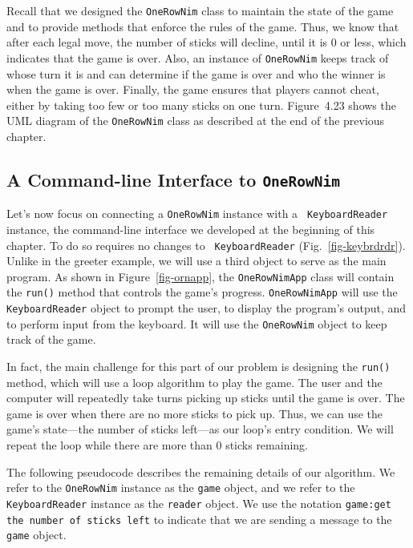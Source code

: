 Recall that we designed the {\tt OneRowNim} class to maintain the state of
the game and to provide methods that enforce the rules of the
game. Thus, we know that after each legal move, the number of sticks will
decline, until it is 0 or less, which indicates that the game is over. 
Also, an instance of {\tt OneRowNim} keeps track of whose turn it is and 
can determine if the game is over and who the winner is when the
game is over.  Finally, the game ensures that players cannot cheat, either 
by taking too few or too many sticks on one turn. 
Figure~4.23 shows the UML diagram of the {\tt OneRowNim}
class as described at the end of the previous chapter. 



\subsection{A Command-line Interface to {\tt OneRowNim}}

Let's now focus on connecting a {\tt OneRowNim} instance with a {\tt
Key\-board\-Read\-er} instance, the command-line interface we developed at the
beginning of this chapter. To do so requires no changes to {\tt
KeyboardReader} (Fig.~\ref{fig-keybrdrdr}). Unlike in the greeter
example, we will use a third object to serve as the main program. As
shown in Figure~\ref{fig-ornapp}, the {\tt OneRowNimApp} class
will contain the {\tt run()} method that controls the game's progress.
{\tt OneRowNimApp} will use the {\tt KeyboardReader} object to prompt
the user, to display the program's output, and to perform input from
the keyboard. It will use the {\tt OneRowNim} object to keep track of
the game.

In fact, the main challenge for this part of our problem is designing
the {\tt run()} method, which will use a loop algorithm to play the
game. The user and the computer will repeatedly take turns picking up
sticks until the game is over. The game is over when there are no more
sticks to pick up. Thus, we can use the game's state---the number of
sticks left---as our loop's entry condition.  We will repeat the loop
while there are more than 0 sticks remaining.

The following pseudocode describes the remaining details of our
algorithm. We refer to the {\tt OneRowNim} instance as the {\tt game} object,
and we refer to the {\tt KeyboardReader} instance as the {\tt reader}
object. We use the notation {\tt game:get the number of sticks left} to
indicate that we are sending a message to the {\tt game} object.

